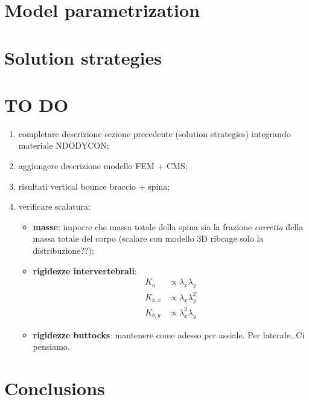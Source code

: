 \section{Model parametrization}\label{sec:parametrization}


\section{Solution strategies}\label{sec:solution}


\section{TO DO}
\begin{enumerate}
  \item completare descrizione sezione precedente (solution strategies) integrando
    materiale NDODYCON;
  \item aggiungere descrizione modello FEM + CMS;
  \item risultati vertical bounce braccio + spina;
  \item verificare scalatura:
    \begin{itemize}
      \item \textbf{masse}: imporre che massa totale della spina sia la frazione
	\emph{corretta} della massa totale del corpo (scalare con modello 3D ribcage solo
	la distribuzione??);
      \item \textbf{rigidezze intervertebrali}:
	\begin{align}
	  K_a &\propto \lambda_x \lambda_y \\ 
	  K_{b,x} &\propto \lambda_x \lambda_y^2 \\
	  K_{b,y} &\propto \lambda_x^2 \lambda_y
	\end{align}
      \item \textbf{rigidezze buttocks}: mantenere come adesso per assiale. Per
	laterale\dots Ci pensiamo.
    \end{itemize}
\end{enumerate}

\section{Conclusions}



